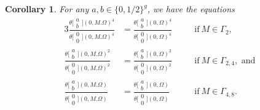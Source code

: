 \documentclass{amsart}
\theoremstyle{definition}
\theoremstyle{plain}
\newtheorem{Cor}[Def]{Corollary}
\begin{document}
\begin{Cor}\label{Gamma}
For any $a,b \in \{0,1/2\}^g$, we have the equations
\begin{alignat*}{3}
    \frac{\theta\bigl[\begin{smallmatrix}a\\b\end{smallmatrix}\bigr](0,M.\varOmega)^4}{\theta\bigl[\begin{smallmatrix}0\\0\end{smallmatrix}\bigr](0,M.\varOmega)^4} &= \frac{\theta\bigl[\begin{smallmatrix}a\\b\end{smallmatrix}\bigr](0,\varOmega)^4}{\theta\bigl[\begin{smallmatrix}0\\0\end{smallmatrix}\bigr](0,\varOmega)^4}& \quad & \text{if}\ M \in \varGamma_2,\\
    \frac{\theta\bigl[\begin{smallmatrix}a\\b\end{smallmatrix}\bigr](0,M.\varOmega)^2}{\theta\bigl[\begin{smallmatrix}0\\0\end{smallmatrix}\bigr](0,M.\varOmega)^2} &= \frac{\theta\bigl[\begin{smallmatrix}a\\b\end{smallmatrix}\bigr](0,\varOmega)^2}{\theta\bigl[\begin{smallmatrix}0\\0\end{smallmatrix}\bigr](0,\varOmega)^2}& \quad & \text{if}\ M \in \varGamma_{2,4}, \text{ and}\\
    \frac{\theta\bigl[\begin{smallmatrix}a\\b\end{smallmatrix}\bigr](0,M.\varOmega)}{\theta\bigl[\begin{smallmatrix}0\\0\end{smallmatrix}\bigr](0,M.\varOmega)} &= \frac{\theta\bigl[\begin{smallmatrix}a\\b\end{smallmatrix}\bigr](0,\varOmega)}{\theta\bigl[\begin{smallmatrix}0\\0\end{smallmatrix}\bigr](0,\varOmega)}& \quad & \text{if}\ M \in \varGamma_{4,8}.\\[-5mm]
\end{alignat*}
\end{Cor}
\end{document}

